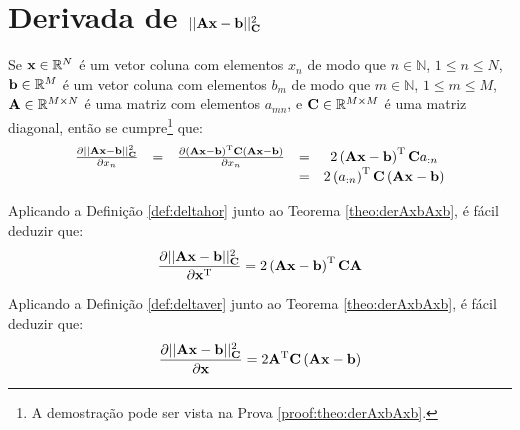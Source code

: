 
\section{Derivada de $||\MATRIX{A}\VECTOR{x}-\VECTOR{b}||_{\MATRIX{C}}^2$ 
}

\begin{theorem}\label{theo:derAxbAxb}
Se 
$\VECTOR{x}\in \mathbb{R}^N$ é um vetor coluna com elementos $x_n$ de modo que
$n\in \mathbb{N}$, $1 \leq n \leq N$, 
$\VECTOR{b}\in \mathbb{R}^M$ é um vetor coluna com elementos $b_m$ de modo que
$m\in \mathbb{N}$, $1 \leq m \leq M$,  
$\MATRIX{A} \in \mathbb{R}^{M\times N}$ é uma matriz com elementos $a_{mn}$, e
$\MATRIX{C} \in \mathbb{R}^{M\times M}$ é uma matriz diagonal, 
então se cumpre\footnote{A demostração pode ser vista na Prova \ref{proof:theo:derAxbAxb}.} que:
\begin{equation}
\begin{matrix}
\frac{\partial ||\MATRIX{A}\VECTOR{x}-\VECTOR{b}||_{\MATRIX{C}}^2}{\partial x_n}&=&
\frac{\partial \left(\MATRIX{A}\VECTOR{x}-\VECTOR{b}\right)^{\transpose}\MATRIX{C}\left(\MATRIX{A}\VECTOR{x}-\VECTOR{b}\right)}{\partial x_n}&=&
2\left(\MATRIX{A}\VECTOR{x}-\VECTOR{b}\right)^{\transpose}\MATRIX{C}a_{:n}\\
~&~&~&=& 2\left(a_{:n}\right)^{\transpose}\MATRIX{C}\left(\MATRIX{A}\VECTOR{x}-  \VECTOR{b}\right)
\end{matrix}
\end{equation}
\end{theorem}

\begin{corollary}\label{coro:derAxbAxb1}
Aplicando a Definição \ref{def:deltahor} junto ao Teorema \ref{theo:derAxbAxb}, é
fácil deduzir que:
\begin{equation}
\frac{\partial ||\MATRIX{A}\VECTOR{x}-\VECTOR{b}||_{\MATRIX{C}}^2}{\partial \VECTOR{x}^{\transpose}}=
2\left(\MATRIX{A}\VECTOR{x}- \VECTOR{b} \right)^{\transpose}\MATRIX{C}\MATRIX{A}
\end{equation}
\end{corollary}

\begin{corollary}\label{coro:derAxbAxb2}
Aplicando a Definição \ref{def:deltaver} junto ao Teorema \ref{theo:derAxbAxb}, é
fácil deduzir que:
\begin{equation}
\frac{\partial ||\MATRIX{A}\VECTOR{x}-\VECTOR{b}||_{\MATRIX{C}}^2}{\partial \VECTOR{x} }=
2 \MATRIX{A}^{\transpose}\MATRIX{C}\left(\MATRIX{A}\VECTOR{x}-\VECTOR{b}\right)
\end{equation}
\end{corollary}
